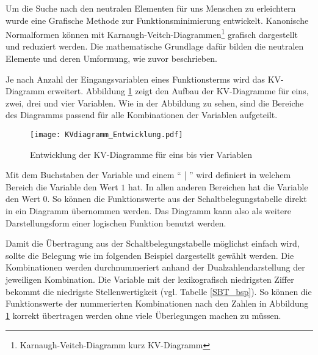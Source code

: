 Um die Suche nach den neutralen Elementen für uns Menschen zu erleichtern wurde eine Grafische Methode zur Funktionsminimierung entwickelt. Kanonische Normalformen können mit Karnaugh-Veitch-Diagrammen\footnote{Karnaugh-Veitch-Diagramm kurz KV-Diagramm} grafisch dargestellt und reduziert werden. Die mathematische Grundlage dafür bilden die neutralen Elemente und deren Umformung, wie zuvor beschrieben.


Je nach Anzahl der Eingangsvariablen eines Funktionsterms wird das KV-Diagramm erweitert. Abbildung \ref{KVdiag_Entw} zeigt den Aufbau der KV-Diagramme für eins, zwei, drei und vier Variablen. Wie in der Abbildung zu sehen, sind die Bereiche des Diagramms passend für alle Kombinationen der Variablen aufgeteilt.

\begin{figure}[htbp] %
	\centering
	\texttt{[image: KVdiagramm\_Entwicklung.pdf]}
	\caption{Entwicklung der KV-Diagramme für eins bis vier Variablen}
	\label{KVdiag_Entw}
\end{figure}

Mit dem Buchstaben der Variable und einem "` | "' wird definiert in welchem Bereich die Variable den Wert $1$ hat. In allen anderen Bereichen hat die Variable den Wert $0$. So können die Funktionswerte aus der Schaltbelegungstabelle direkt in ein Diagramm übernommen werden. Das Diagramm kann also als weitere Darstellungsform einer logischen Funktion benutzt werden.

Damit die Übertragung aus der Schaltbelegungstabelle möglichst einfach wird, sollte die Belegung wie im folgenden Beispiel dargestellt gewählt werden. Die Kombinationen werden durchnummeriert anhand der Dualzahlendarstellung der jeweiligen Kombination. Die Variable mit der lexikografisch niedrigsten Ziffer bekommt die niedrigste Stellenwertigkeit (vgl. Tabelle \ref{SBT_bsp}). So können die Funktionswerte der nummerierten Kombinationen nach den Zahlen in Abbildung \ref{KVdiag_Entw} korrekt übertragen werden ohne viele Überlegungen machen zu müssen. 

